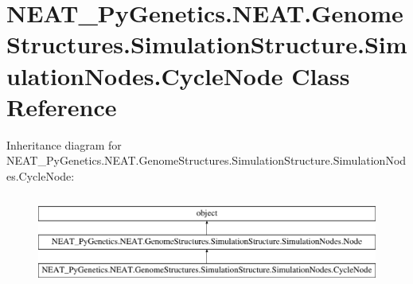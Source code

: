 \hypertarget{classNEAT__PyGenetics_1_1NEAT_1_1GenomeStructures_1_1SimulationStructure_1_1SimulationNodes_1_1CycleNode}{}\section{N\+E\+A\+T\+\_\+\+Py\+Genetics.\+N\+E\+A\+T.\+Genome\+Structures.\+Simulation\+Structure.\+Simulation\+Nodes.\+Cycle\+Node Class Reference}
\label{classNEAT__PyGenetics_1_1NEAT_1_1GenomeStructures_1_1SimulationStructure_1_1SimulationNodes_1_1CycleNode}
Inheritance diagram for N\+E\+A\+T\+\_\+\+Py\+Genetics.\+N\+E\+A\+T.\+Genome\+Structures.\+Simulation\+Structure.\+Simulation\+Nodes.\+Cycle\+Node\+:\begin{figure}[H]
\begin{center}
\leavevmode
\includegraphics[height=3.000000cm]{classNEAT__PyGenetics_1_1NEAT_1_1GenomeStructures_1_1SimulationStructure_1_1SimulationNodes_1_1CycleNode}
\end{center}
\end{figure}
